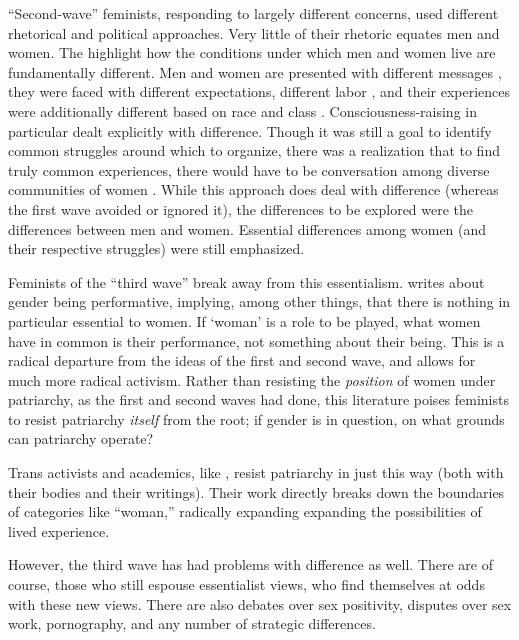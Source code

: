\documentclass[man,12pt,natbib]{apa6}
\begin{document}
``Second-wave'' feminists, responding to largely different concerns, used
different rhetorical and political approaches. Very little of their rhetoric
equates men and women. The highlight how the conditions under which men and
women live are fundamentally different. Men and women are presented with
different messages \citep{Morgan68}, they were faced with different
expectations, different labor \citep{Susan70}, and their experiences were
additionally different based on race and class
\citep{CombaheeRiverCollective77}. Consciousness-raising in particular dealt
explicitly with difference. Though it was still a goal to identify common
struggles around which to organize, there was a realization that to find truly
common experiences, there would have to be conversation among diverse
communities of women \citep{CombaheeRiverCollective77}. While this approach
does deal with difference (whereas the first wave avoided or ignored it), the
differences to be explored were the differences between men and women.
Essential differences among women (and their respective struggles) were still
emphasized.


Feminists of the ``third wave'' break away from this essentialism.
\citet{Butler88} writes about gender being performative, implying, among other
things, that there is nothing in particular essential to women. If `woman' is a
role to be played, what women have in common is their performance, not
something about their being. This is a radical departure from the ideas of the
first and second wave, and allows for much more radical activism. Rather than
resisting the \emph{position} of women under patriarchy, as the first and
second waves had done, this literature poises feminists to resist patriarchy
\emph{itself} from the root; if gender is in question, on what grounds can
patriarchy operate? 

Trans activists and academics, like \citet{Stryker07}, resist patriarchy in
just this way (both with their bodies and their writings). Their work directly
breaks down the boundaries of categories like ``woman,'' radically expanding
expanding the possibilities of lived experience.

However, the third wave has had problems with difference as well. There are of
course, those who still espouse essentialist views, who find themselves at odds
with these new views. There are also debates over sex positivity, disputes over
sex work, pornography, and any number of strategic differences.
\end{document}
